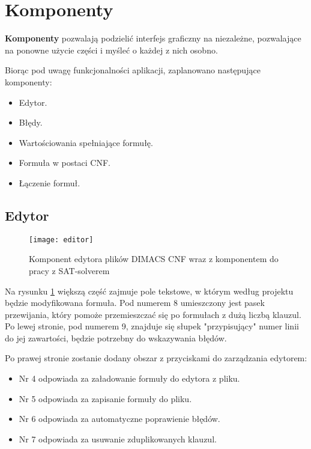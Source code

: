 \documentclass[a4paper,12pt]{book}
\theoremstyle{definition}
\begin{document}
\newpage

\section{Komponenty}

\textbf{Komponenty} pozwalają podzielić interfejs graficzny na niezależne, pozwalające na ponowne użycie części i myśleć o każdej z nich osobno.

Biorąc pod uwagę funkcjonalności aplikacji, zaplanowano następujące komponenty: 

\begin{itemize}
    \item Edytor.
    \item Błędy.
    \item Wartościowania spełniające formułę.
    \item Formuła w postaci CNF.
    \item Łączenie formuł.
\end{itemize}

\subsection{Edytor}

\begin{figure}[ht]
    \centering
    \texttt{[image: editor]}
    \caption{Komponent edytora plików DIMACS CNF wraz z komponentem do pracy z SAT-solverem}
    \label{fig:editor}
\end{figure}

Na rysunku \ref{fig:editor} większą część zajmuje pole tekstowe, w którym według projektu będzie modyfikowana formuła. Pod numerem 8 umieszczony jest pasek przewijania, który pomoże przemieszczać się po formułach z dużą liczbą klauzul. Po lewej stronie, pod numerem 9, znajduje się słupek "przypisujący" numer linii do jej zawartości, będzie potrzebny do wskazywania błędów.

Po prawej stronie zostanie dodany obszar z przyciskami do zarządzania edytorem: 

\begin{itemize}
    \item Nr 4 odpowiada za załadowanie formuły do edytora z pliku.
    \item Nr 5 odpowiada za zapisanie formuły do pliku.
    \item Nr 6 odpowiada za automatyczne poprawienie błędów.
    \item Nr 7 odpowiada za usuwanie zduplikowanych klauzul.
\end{itemize}
\end{document}
